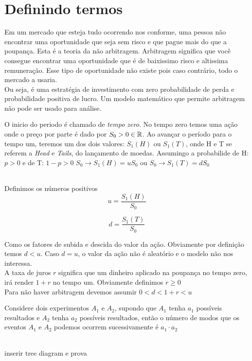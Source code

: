 \documentclass{article}
\begin{document}
\section{Definindo termos}
Em um mercado que esteja tudo ocorrendo nos conforme, uma pessoa não encontrar uma oportunidade que seja sem risco e que pague mais do que a poupança. Esta é a teoria da não arbitragem. Arbitragem significa que você consegue encontrar uma oportunidade que é de baixissimo risco e altissima remuneração. Esse tipo de oportunidade não existe pois caso contrário, todo o mercado a usaria.
\\
Ou seja, é uma estratégia de investimento com zero probabilidade de perda e probabilidade positiva de lucro. Um modelo matemático que permite arbitragem não pode ser usado para análise.

O inicio do periodo é chamado de \textit{tempo zero}. No tempo zero temos uma ação onde o preço por parte é dado por $S_0 > 0 \in \mathbb{R}$. Ao avançar o período para o tempo um, teremos um dos dois valores: $S_1(H)$ ou $S_1(T)$, onde H e T se referem a \textit{Head} e \textit{Tails}, do lançamento de moedas. Assumingo a probabilide de H: $p > 0$ e de T: $1 - p > 0$
$S_0 \to S_1(H) = uS_0$ ou $S_0 \to S_1(T) = dS_0$

\\
Definimos os números positivos
$$
u = \frac{S_1(H)}{S_0}
$$

$$
d = \frac{S_1(T)}{S_0}
$$

Como os fatores de subida e descida do valor da ação. Obviamente por definição temos $d < u$. Caso $d = u$, o valor da ação não é aleatório e o modelo não nos interessa.
\\
A taxa de juros $r$ significa que um dinheiro aplicado na poupança no tempo zero, irá render $1+r$ no tempo um. Obviamente definimos $r \geq 0$
\\
Para não haver arbitragem devemos assumir $0 < d < 1+r < u$


Considere dois experimentos $A_1$ e $A_2$, supondo que $A_1$ tenha $a_1$ possíveis resultados e $A_2$ tenha $a_2$
possíveis resultados, então o número de modos que os eventos $A_1$ e $A_2$ podemos ocorrem sucessivamente é $a_1\cdot a_2$

\\
inserir tree diagram e prova
\\
\end{document}
